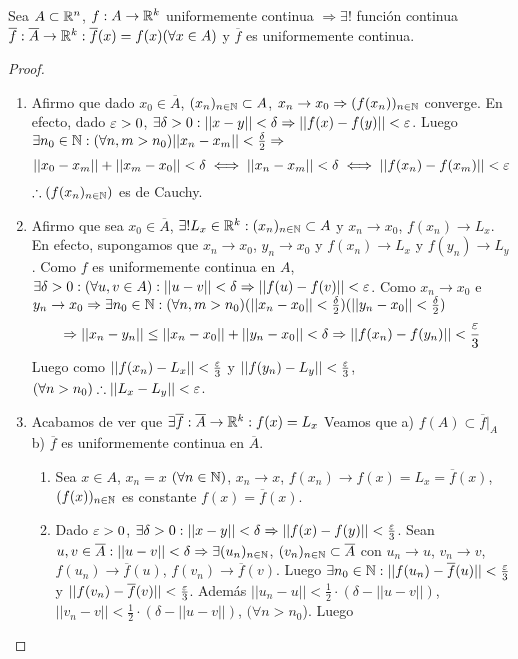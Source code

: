 \begin{theorem}
  Sea $A \subset \mathbb{R}^n$, $f: A \to \mathbb{R}^k$ uniformemente continua $\Rightarrow \exists !$ función continua $\overline{f}: \overline{A} \to \mathbb{R}^k : \overline{f}(x) = f(x) (\forall x \in A)$ y $\overline{f}$ es uniformemente continua.
  \begin{proof}
    \begin{enumerate}
      \item Afirmo que dado $x_0 \in \overline{A}$, $(x_n)_{n \in \mathbb{N}} \subset A$, $x_n \to x_0 \Rightarrow (f(x_n))_{n \in \mathbb{N}}$ converge. En efecto, dado $\varepsilon > 0$, $\exists \delta > 0 : ||x-y|| < \delta \Rightarrow ||f(x) - f(y)|| < \varepsilon$. Luego $\exists n_0 \in \mathbb{N} : (\forall n, m > n_0) ||x_n - x_m|| < \frac{\delta}{2} \Rightarrow$ \begin{equation} 
        ||x_0 - x_m|| + ||x_m - x_0|| < \delta \iff ||x_n - x_m|| < \delta \iff ||f(x_n) - f(x_m)|| < \varepsilon
      \end{equation} $\therefore (f(x_n)_{n \in \mathbb{N}})$ es de Cauchy.
      \item Afirmo que sea $x_0 \in \overline{A}$, $\exists ! L_x \in \mathbb{R}^k : (x_n)_{n \in \mathbb{N}} \subset A$ y $x_n \to x_0$, $f(x_n) \to L_x$. En efecto, supongamos que $x_n \to x_0$, $y_n \to x_0$ y $f(x_n) \to L_x$ y $f(y_n) \to L_y$. Como $f$ es uniformemente continua en $A$, $\exists \delta > 0 : (\forall u, v \in A) : ||u-v|| < \delta \Rightarrow ||f(u) - f(v)|| < \varepsilon$. Como $x_n \to x_0$ e $y_n \to x_0 \Rightarrow \exists n_0 \in \mathbb{N} : (\forall n, m > n_0) (||x_n - x_0|| < \frac{\delta}{2}) (|| y_n - x_0 || < \frac{\delta}{2})$ \begin{equation}
        \Rightarrow ||x_n - y_n|| \leq ||x_n - x_0|| + ||y_n - x_0|| < \delta \Rightarrow ||f(x_n) - f(y_n)|| < \frac{\varepsilon}{3}
      \end{equation} Luego como $||f(x_n) - L_x|| < \frac{\varepsilon}{3}$ y $||f(y_n) - L_y|| < \frac{\varepsilon}{3}$, $(\forall n > n_0) \therefore ||L_x - L_y|| < \varepsilon$.
      \item Acabamos de ver que $\exists \overline{f}: \overline{A} \to \mathbb{R}^k : f(x) = L_x$ Veamos que a) $f(A) \subset \overline{f}|_A$ b) $\overline{f}$ es uniformemente continua en $\overline{A}$. \begin{enumerate}
        \item Sea $x \in A$, $x_n = x$ $(\forall n \in \mathbb{N})$, $x_n \to x$, $f(x_n) \to f(x) = L_x = \overline{f}(x)$, $(f(x))_{n \in \mathbb{N}}$ es constante $f(x) = \overline{f}(x)$.
        \item Dado $\varepsilon > 0$, $\exists \delta > 0 : ||x-y|| < \delta \Rightarrow ||f(x) - f(y)|| < \frac{\varepsilon}{3}$. Sean $u, v \in \overline{A} : ||u - v|| < \delta \Rightarrow \exists (u_n)_{n \in \mathbb{N}}$, $(v_n)_{n \in \mathbb{N}} \subset \overline{A}$ con $u_n \to u$, $v_n \to v$, $f(u_n) \to \overline{f}(u)$, $f(v_n) \to \overline{f}(v)$. Luego $\exists n_0 \in \mathbb{N} : ||f(u_n) - \overline{f}(u)|| < \frac{\varepsilon}{3}$ y $||f(v_n) - \overline{f}(v)|| < \frac{\varepsilon}{3}$. Además $||u_n - u|| < \frac{1}{2} \cdot (\delta - ||u - v||)$, $||v_n - v|| < \frac{1}{2} \cdot (\delta - ||u - v||)$, $(\forall n > n_0$). Luego \begin{equation}

\end{equation}
\end{enumerate}
\end{enumerate}
\end{proof}
\end{theorem}
